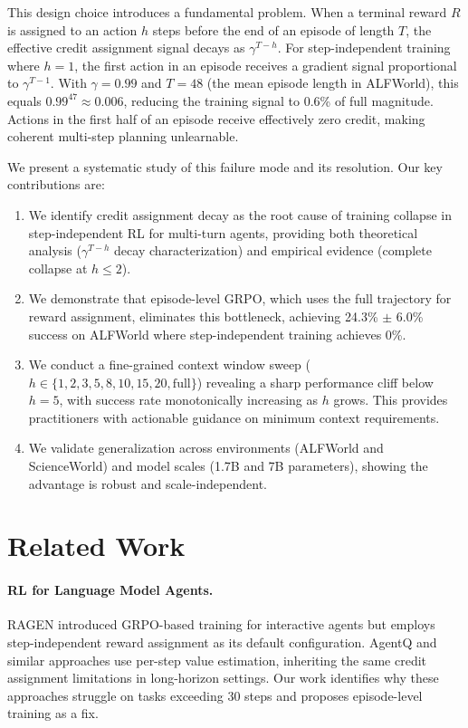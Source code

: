 \documentclass[11pt]{article}
\begin{document}
This design choice introduces a fundamental problem. When a terminal reward $R$ is assigned to an action $h$ steps before the end of an episode of length $T$, the effective credit assignment signal decays as $\gamma^{T-h}$. For step-independent training where $h=1$, the first action in an episode receives a gradient signal proportional to $\gamma^{T-1}$. With $\gamma=0.99$ and $T=48$ (the mean episode length in ALFWorld), this equals $0.99^{47} \approx 0.006$, reducing the training signal to 0.6\% of full magnitude. Actions in the first half of an episode receive effectively zero credit, making coherent multi-step planning unlearnable.

We present a systematic study of this failure mode and its resolution. Our key contributions are:

\begin{enumerate}
\item We identify credit assignment decay as the root cause of training collapse in step-independent RL for multi-turn agents, providing both theoretical analysis ($\gamma^{T-h}$ decay characterization) and empirical evidence (complete collapse at $h \leq 2$).

\item We demonstrate that episode-level GRPO, which uses the full trajectory for reward assignment, eliminates this bottleneck, achieving 24.3\% $\pm$ 6.0\% success on ALFWorld where step-independent training achieves 0\%.

\item We conduct a fine-grained context window sweep ($h \in \{1,2,3,5,8,10,15,20,\text{full}\}$) revealing a sharp performance cliff below $h=5$, with success rate monotonically increasing as $h$ grows. This provides practitioners with actionable guidance on minimum context requirements.

\item We validate generalization across environments (ALFWorld and ScienceWorld) and model scales (1.7B and 7B parameters), showing the advantage is robust and scale-independent.
\end{enumerate}

\section{Related Work}

\paragraph{RL for Language Model Agents.}
RAGEN introduced GRPO-based training for interactive agents but employs step-independent reward assignment as its default configuration. AgentQ and similar approaches use per-step value estimation, inheriting the same credit assignment limitations in long-horizon settings. Our work identifies why these approaches struggle on tasks exceeding 30 steps and proposes episode-level training as a fix.
\end{document}
